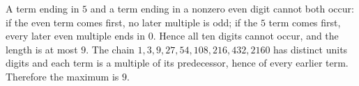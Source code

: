 A term ending in $5$ and a term ending in a nonzero even digit cannot both occur: if the even term comes first, no later multiple is odd; if the $5$ term comes first, every later even multiple ends in $0$. Hence all ten digits cannot occur, and the length is at most $9$. The chain $\boxed{1,3,9,27,54,108,216,432,2160}$ has distinct units digits and each term is a multiple of its predecessor, hence of every earlier term. Therefore the maximum is $\boxed9$.
